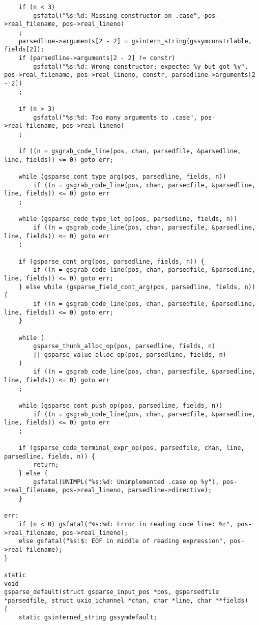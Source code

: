 \documentclass{report}
\begin{document}
\begin{verbatim}
    if (n < 3)
        gsfatal("%s:%d: Missing constructor on .case", pos->real_filename, pos->real_lineno)
    ;
    parsedline->arguments[2 - 2] = gsintern_string(gssymconstrlable, fields[2]);
    if (parsedline->arguments[2 - 2] != constr)
        gsfatal("%s:%d: Wrong constructor; expected %y but got %y", pos->real_filename, pos->real_lineno, constr, parsedline->arguments[2 - 2])
    ;

    if (n > 3)
        gsfatal("%s:%d: Too many arguments to .case", pos->real_filename, pos->real_lineno)
    ;

    if ((n = gsgrab_code_line(pos, chan, parsedfile, &parsedline, line, fields)) <= 0) goto err;

    while (gsparse_cont_type_arg(pos, parsedline, fields, n))
        if ((n = gsgrab_code_line(pos, chan, parsedfile, &parsedline, line, fields)) <= 0) goto err
    ;

    while (gsparse_code_type_let_op(pos, parsedline, fields, n))
        if ((n = gsgrab_code_line(pos, chan, parsedfile, &parsedline, line, fields)) <= 0) goto err
    ;

    if (gsparse_cont_arg(pos, parsedline, fields, n)) {
        if ((n = gsgrab_code_line(pos, chan, parsedfile, &parsedline, line, fields)) <= 0) goto err;
    } else while (gsparse_field_cont_arg(pos, parsedline, fields, n)) {
        if ((n = gsgrab_code_line(pos, chan, parsedfile, &parsedline, line, fields)) <= 0) goto err;
    }

    while (
        gsparse_thunk_alloc_op(pos, parsedline, fields, n)
        || gsparse_value_alloc_op(pos, parsedline, fields, n)
    )
        if ((n = gsgrab_code_line(pos, chan, parsedfile, &parsedline, line, fields)) <= 0) goto err
    ;

    while (gsparse_cont_push_op(pos, parsedline, fields, n))
        if ((n = gsgrab_code_line(pos, chan, parsedfile, &parsedline, line, fields)) <= 0) goto err
    ;

    if (gsparse_code_terminal_expr_op(pos, parsedfile, chan, line, parsedline, fields, n)) {
        return;
    } else {
        gsfatal(UNIMPL("%s:%d: Unimplemented .case op %y"), pos->real_filename, pos->real_lineno, parsedline->directive);
    }

err:
    if (n < 0) gsfatal("%s:%d: Error in reading code line: %r", pos->real_filename, pos->real_lineno);
    else gsfatal("%s:$: EOF in middle of reading expression", pos->real_filename);
}

static
void
gsparse_default(struct gsparse_input_pos *pos, gsparsedfile *parsedfile, struct uxio_ichannel *chan, char *line, char **fields)
{
    static gsinterned_string gssymdefault;


\end{verbatim}
\end{document}
